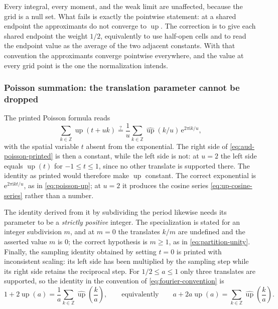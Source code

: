 \documentclass[11pt,oneside]{article}
\theoremstyle{definition}
\theoremstyle{remark}
\newcommand{\Z}{\mathbb Z}
\newcommand{\Up}{\operatorname{up}}
\newcommand{\e}{\mathrm e}
\newcommand{\ii}{\mathrm i}
\begin{document}
Every integral, every moment, and the weak limit are unaffected, because the grid is a null
set.  What fails is exactly the pointwise statement: at a shared endpoint the approximants do
not converge to $\Up$.  The correction is to give each shared endpoint the weight $1/2$,
equivalently to use half-open cells and to read the endpoint value as the average of the two
adjacent constants.  With that convention the approximants converge pointwise everywhere,
and the value at every grid point is the one the normalization intends.

\subsubsection{Poisson summation: the translation parameter cannot be dropped}

The printed Poisson formula reads
\begin{equation}
 \sum_{k\in\Z}\Up(t+uk)
 \overset{?}{=}\frac1u\sum_{k\in\Z}\widehat{\Up}(k/u)\,\e^{2\pi\ii k/u},
                                                          \label{eq:aud-poisson-printed}
\end{equation}
with the spatial variable $t$ absent from the exponential.  The right side of
\eqref{eq:aud-poisson-printed} is then a constant, while the left side is not: at $u=2$ the
left side equals $\Up(t)$ for $-1\le t\le1$, since no other translate is supported there.  The
identity as printed would therefore make $\Up$ constant.  The correct exponential is
$\e^{2\pi\ii kt/u}$, as in \eqref{eq:poisson-up}; at $u=2$ it produces the cosine series
\eqref{eq:up-cosine-series} rather than a number.

The identity derived from it by subdividing the period likewise needs its parameter to be a
\emph{strictly positive} integer.  The specialization is stated for an integer subdivision
$m$, and at $m=0$ the translates $k/m$ are undefined and the asserted value $m$ is $0$; the
correct hypothesis is $m\ge1$, as in \eqref{eq:partition-unity}.  Finally, the sampling
identity obtained by setting $t=0$ is printed with inconsistent scaling: its left side has
been multiplied by the sampling step while its right side retains the reciprocal step.  For
$1/2\le a\le1$ only three translates are supported, so the identity in the convention of
\eqref{eq:fourier-convention} is
\begin{equation}
 1+2\Up(a)=\frac1a\sum_{k\in\Z}\widehat{\Up}\!\left(\frac ka\right),
 \qquad\text{equivalently}\qquad
 a+2a\Up(a)=\sum_{k\in\Z}\widehat{\Up}\!\left(\frac ka\right).
                                                          \label{eq:aud-sampling-scaled}
\end{equation}
\end{document}
